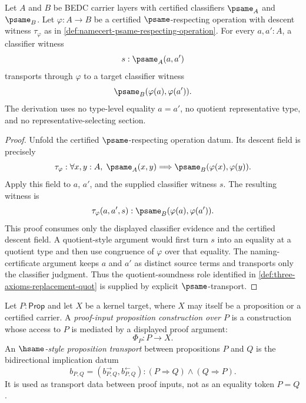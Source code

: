 \begin{theorem}
\label{thm:namecert-psame-transport-replaces-quot-sound}
Let $A$ and $B$ be BEDC carrier layers with certified classifiers $\psame_A$ and $\psame_B$. Let $\varphi:A\to B$ be a certified $\psame$-respecting operation with descent witness $\tau_\varphi$ as in \autoref{def:namecert-psame-respecting-operation}. For every $a,a':A$, a classifier witness
$$
s:\psame_A(a,a')
$$
transports through $\varphi$ to a target classifier witness
$$
\psame_B(\varphi(a),\varphi(a')).
$$
The derivation uses no type-level equality $a=a'$, no quotient representative type, and no representative-selecting section.
\end{theorem}
\begin{proof}
Unfold the certified $\psame$-respecting operation datum. Its descent field is precisely
$$
\tau_\varphi:\forall x,y:A,\; \psame_A(x,y)\Longrightarrow \psame_B(\varphi(x),\varphi(y)).
$$
Apply this field to $a$, $a'$, and the supplied classifier witness $s$. The resulting witness is
$$
\tau_\varphi(a,a',s):\psame_B(\varphi(a),\varphi(a')).
$$
This proof consumes only the displayed classifier evidence and the certified descent field. A quotient-style argument would first turn $s$ into an equality at a quotient type and then use congruence of $\varphi$ over that equality. The naming-certificate argument keeps $a$ and $a'$ as distinct source terms and transports only the classifier judgment. Thus the quotient-soundness role identified in \autoref{def:three-axioms-replacement-quot} is supplied by explicit $\psame$-transport.
\end{proof}

\begin{definition}
\label{def:proof-input-proposition-construction}
Let $P:\mathsf{Prop}$ and let $X$ be a kernel target, where $X$ may itself be a proposition or a certified carrier. A \emph{proof-input proposition construction over $P$} is a construction whose access to $P$ is mediated by a displayed proof argument:
$$
\Phi_P:P\to X.
$$
An \emph{$\hsame$-style proposition transport} between propositions $P$ and $Q$ is the bidirectional implication datum
$$
b_{P,Q}=(b^\rightarrow_{P,Q},b^\leftarrow_{P,Q}):(P\Rightarrow Q)\land(Q\Rightarrow P).
$$
It is used as transport data between proof inputs, not as an equality token $P=Q$.
\end{definition}

